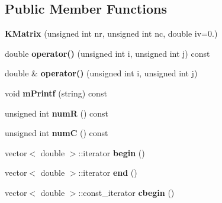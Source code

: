 \subsection*{Public Member Functions}
\begin{DoxyCompactItemize}
\item 
\hypertarget{class_k_base_1_1_k_matrix_a2cccedf095e532984e75dbd51c9cc7ff}{{\bfseries K\-Matrix} (unsigned int nr, unsigned int nc, double iv=0.)}\label{class_k_base_1_1_k_matrix_a2cccedf095e532984e75dbd51c9cc7ff}

\item 
\hypertarget{class_k_base_1_1_k_matrix_af3985ff0b33b0819275f480cc6b90204}{double {\bfseries operator()} (unsigned int i, unsigned int j) const }\label{class_k_base_1_1_k_matrix_af3985ff0b33b0819275f480cc6b90204}

\item 
\hypertarget{class_k_base_1_1_k_matrix_ada1010a6a9405a3db032d64475798894}{double \& {\bfseries operator()} (unsigned int i, unsigned int j)}\label{class_k_base_1_1_k_matrix_ada1010a6a9405a3db032d64475798894}

\item 
\hypertarget{class_k_base_1_1_k_matrix_ad6bfd476ee5e2370a67739177494f026}{void {\bfseries m\-Printf} (string) const }\label{class_k_base_1_1_k_matrix_ad6bfd476ee5e2370a67739177494f026}

\item 
\hypertarget{class_k_base_1_1_k_matrix_ac6113a035b1e439bb4c26463965f1d88}{unsigned int {\bfseries num\-R} () const }\label{class_k_base_1_1_k_matrix_ac6113a035b1e439bb4c26463965f1d88}

\item 
\hypertarget{class_k_base_1_1_k_matrix_a7c0d998a29889fd746f960061fc44a1f}{unsigned int {\bfseries num\-C} () const }\label{class_k_base_1_1_k_matrix_a7c0d998a29889fd746f960061fc44a1f}

\item 
\hypertarget{class_k_base_1_1_k_matrix_a27e030bc0368bf4ce42f88db592381f3}{vector$<$ double $>$\-::iterator {\bfseries begin} ()}\label{class_k_base_1_1_k_matrix_a27e030bc0368bf4ce42f88db592381f3}

\item 
\hypertarget{class_k_base_1_1_k_matrix_ae0dd848ce08ab94719a1a2e20e6dd1bd}{vector$<$ double $>$\-::iterator {\bfseries end} ()}\label{class_k_base_1_1_k_matrix_ae0dd848ce08ab94719a1a2e20e6dd1bd}

\item 
\hypertarget{class_k_base_1_1_k_matrix_adab9d9e6f5d97055585c43353f7147b9}{vector$<$ double $>$\-::const\-\_\-iterator {\bfseries cbegin} ()}\label{class_k_base_1_1_k_matrix_adab9d9e6f5d97055585c43353f7147b9}


\end{DoxyCompactItemize}
